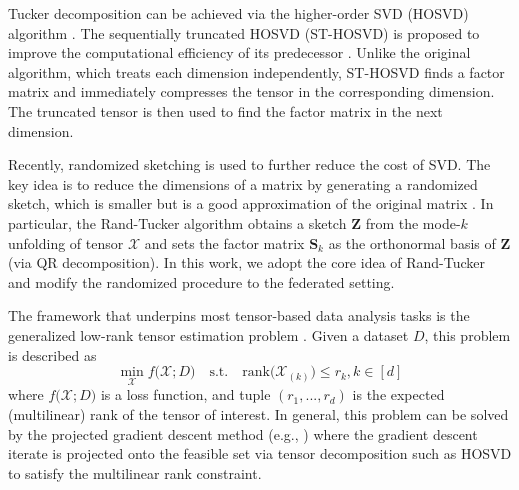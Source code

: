 Tucker decomposition can be achieved via the higher-order SVD (HOSVD) algorithm \cite{kolda2009tensor}. The sequentially truncated HOSVD (ST-HOSVD) is proposed to improve the computational efficiency of its predecessor \cite{vannieuwenhoven2012new}. Unlike the original algorithm, which treats each dimension independently, ST-HOSVD finds a factor matrix and immediately compresses the tensor in the corresponding dimension. The truncated tensor is then used to find the factor matrix in the next dimension.

Recently, randomized sketching is used to further reduce the cost of SVD. The key idea is to reduce the dimensions of a matrix by generating a randomized sketch, which is smaller but is a good approximation of the original matrix \cite{halko2011finding}. In particular, the Rand-Tucker algorithm \cite{zhou2014decomposition} obtains a sketch 
$\mathbf{Z}$ from the mode-$k$ unfolding of tensor $\boldsymbol{\mathcal{X}}$ and sets the factor matrix $\mathbf{S}_k$  as the orthonormal basis of $\mathbf{Z}$ (via QR decomposition). In this work, we adopt the core idea of Rand-Tucker and modify the randomized procedure to the federated setting.

The framework that underpins most tensor-based data analysis tasks is the generalized low-rank tensor estimation problem \cite{han2022optimal}. Given a dataset $\mathit{D}$, this problem is described as
\begin{equation}\label{eq:estimation}
    \min_{\boldsymbol{\mathcal{X}}} f\big(\boldsymbol{\mathcal{X}}; \mathit{D}\big) \quad
    \text{s.t.} \quad \text{rank}\big(\boldsymbol{\mathcal{X}}_{(k)}\big) \leq r_k, k\in[d]
\end{equation}
where $f\big(\boldsymbol{\mathcal{X}}; \mathit{D}\big)$ is a loss function, and tuple $(r_1, ..., r_d)$ is the expected (multilinear) rank of the tensor of interest. 
In general, this problem can be solved by the projected gradient descent method (e.g., \cite{ahmed2020tensor}) where the gradient descent iterate is projected onto the feasible set via tensor decomposition such as HOSVD to satisfy the multilinear rank constraint. 

